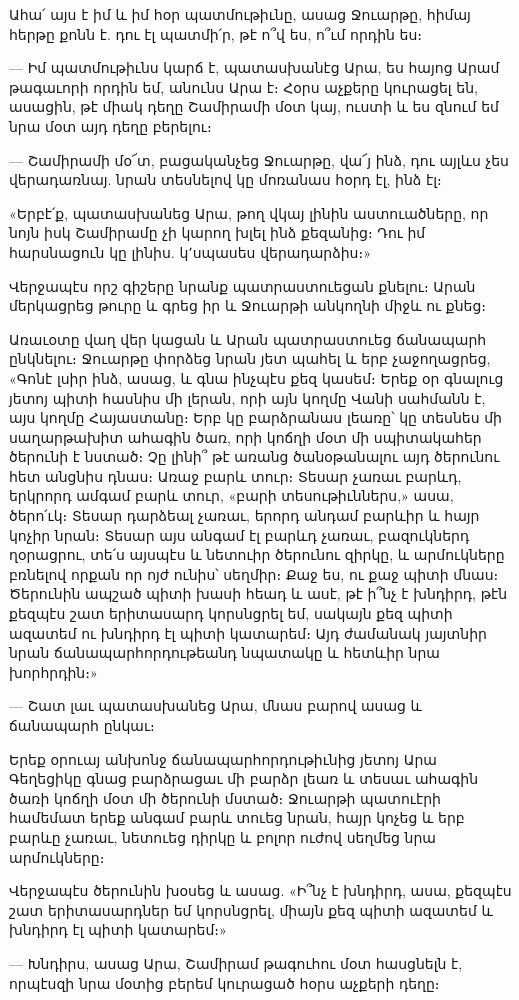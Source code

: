 \documentclass{article}
\begin{document}
{Ահա՛ այս է իմ և իմ հօր պատմութիւնը, ասաց Ջուարթը, հիմայ հերթը քոնն է. դու էլ պատմի՛ր, թէ ո՞վ ես, ո՞ւմ որդին ես։

— Իմ պատմութիւնս կարճ է, պատասխանէց Արա, ես հայոց Արամ թագաւորի որդին եմ, անունս Արա է։ Հօրս աչքերը կուրացել են, ասացին, թէ միակ դեղը Շամիրամի մօտ կայ, ուստի և ես զնում եմ նրա մօտ այդ դեղը բերելու։

— Շամիրամի մօ՜տ, բացականչեց Ջուարթը, վա՜յ ինձ, դու այլևս չես վերադառնայ. նրան տեսնելով կը մոռանաս հօրդ էլ, ինձ էլ։

«Երբէ՛ք, պատասխանեց Արա, թող վկայ լինին աստուածները, որ նոյն իսկ Շամիրամը չի կարող խլել ինձ քեզանից։ Դու իմ հարսնացուն կը լինիս. կ՚սպասես վերադարձիս։»

Վերջապէս որշ գիշերը նրանք պատրաստուեցան քնելու։ Արան մերկացրեց թուրը և գրեց իր և Ջուարթի անկողնի միջև ու քնեց։

Առաւօտը վաղ վեր կացան և Արան պատրաստուեց ճանապարհ ընկնելու։ Ջուարթը փորձեց նրան յետ պահել և երբ չաջողացրեց, «Գոնէ լսիր ինձ, ասաց, և գնա ինչպէս քեզ կասեմ։ Երեք օր գնալուց յետոյ պիտի հասնիս մի լերան, որի այն կողմը Վանի սահմանն է, այս կողմը Հայաստանը։ Երբ կը բարձրանաս լեառը՝ կը տեսնես մի սաղարթախիտ ահագին ծառ, որի կոճղի մօտ մի սպիտակահեր ծերունի է նստած։ Չը լինի՞ թէ առանց ծանօթանալու այդ ծերունու հետ անցնիս դնաս։ Առաջ բարև տուր։ Տեսար չառաւ բարևդ, երկրորդ ամգամ բարև տուր, «բարի տեսութիւններս,» ասա, ծերո՛ւկ։ Տեսար դարձեալ չառաւ, երորդ անդամ բարևիր և հայր կոչիր նրան։ Տեսար այս անգամ էլ բարևդ չառաւ, բազուկներդ ղօրացրու, տե՛ս այսպէս և նետուիր ծերունու զիրկը, և արմուկները բռնելով որքան որ ոյժ ունիս՝ սեղմիր։ Քաջ ես, ու քաջ պիտի մնաս։ Ծերունին ապշած պիտի խասի հեադ և ասէ, թէ ի՞նչ է խնդիրդ, թէն քեզպէս շատ երիտասարդ կորսնցրել եմ, սակայն քեզ պիտի ազատեմ ու խնդիրդ էլ պիտի կատարեմ։ Այդ ժամանակ յայտնիր նրան ճանապարհորդութեանդ նպատակը և հետևիր նրա խորհրդին։»

— Շատ լաւ պատասխանեց Արա, մնաս բարով ասաց և ճանապարհ ընկաւ։

Երեք օրուայ անխոնջ ճանապարհորդութիւնից յետոյ Արա Գեղեցիկը գնաց բարձրացաւ մի բարձր լեառ և տեսաւ ահագին ծառի կոճղի մօտ մի ծերունի մստած։ Ջուարթի պատուէրի համեմատ երեք անգամ բարև տուեց նրան, հայր կոչեց և երբ բարևը չառաւ, նետուեց դիրկը և բոլոր ուժով սեղմեց նրա արմուկները։

Վերջապէս ծերունին խօսեց և ասաց. «Ի՞նչ է խնդիրդ, ասա, քեզպէս շատ երիտասարդներ եմ կորսնցրել, միայն քեզ պիտի ազատեմ և խնդիրդ էլ պիտի կատարեմ։»

— Խնդիրս, ասաց Արա, Շամիրամ թագուհու մօտ հասցնելն է, որպէսզի նրա մօտից բերեմ կուրացած հօրս աչքերի դեղը։

}
\end{document}
